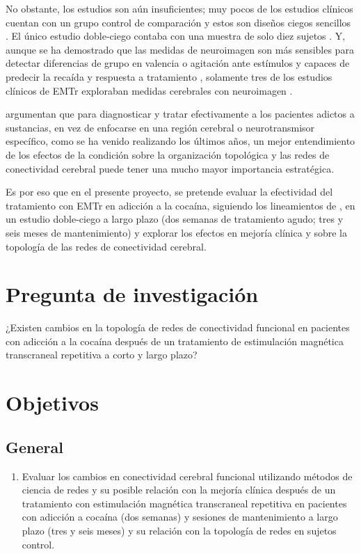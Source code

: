 No obstante, los estudios son aún insuficientes; muy pocos de los estudios clínicos cuentan con un grupo control de comparación y estos son diseños ciegos sencillos \parencite{Kearney-Ramos2018a, Kearney-Ramos2019, Terraneo2016,Hanlon2015}.
El único estudio doble-ciego contaba con una muestra de solo diez sujetos \parencite{Bolloni2016}.
Y, aunque se ha demostrado que las medidas de neuroimagen son más sensibles para detectar diferencias de grupo en valencia o agitación ante estímulos \parencite{Goldstein2012a} y capaces de predecir la recaída y respuesta a tratamiento \parencite{Suckling2017}, solamente tres de los estudios clínicos de EMTr exploraban medidas cerebrales con neuroimagen \parencite{Kearney-Ramos2018a, Kearney-Ramos2019, Hanlon2015}. \par
\textcite{Steele2018} argumentan que para diagnosticar y tratar efectivamente a los pacientes adictos a sustancias, en vez de enfocarse en una región cerebral o neurotransmisor específico, como se ha venido realizando los últimos años, un mejor entendimiento de los efectos de la condición sobre la organización topológica y las redes de conectividad cerebral puede tener una mucho mayor importancia estratégica. \par
Es por eso que en el presente proyecto, se pretende evaluar la efectividad del tratamiento con EMTr en adicción a la cocaína, siguiendo los lineamientos de \textcite{Ekhtiari2019}, en un estudio doble-ciego a largo plazo (dos semanas de tratamiento agudo; tres y seis meses de mantenimiento) y explorar los efectos en mejoría clínica y sobre la topología de las redes de conectividad cerebral.

\section{Pregunta de investigación}
¿Existen cambios en la topología de redes de conectividad funcional en pacientes con adicción a la cocaína después de un tratamiento de estimulación magnética transcraneal repetitiva a corto y largo plazo?

\section{Objetivos}
\subsection{General}
\begin{enumerate}[label=General., left= \parindent]
    \item Evaluar los cambios en conectividad cerebral funcional utilizando métodos de ciencia de redes y su posible relación con la mejoría clínica después de un tratamiento con estimulación magnética transcraneal repetitiva en pacientes con adicción a cocaína (dos semanas) y sesiones de mantenimiento a largo plazo (tres y seis meses) y su relación con la topología de redes en sujetos control.
\end{enumerate}
